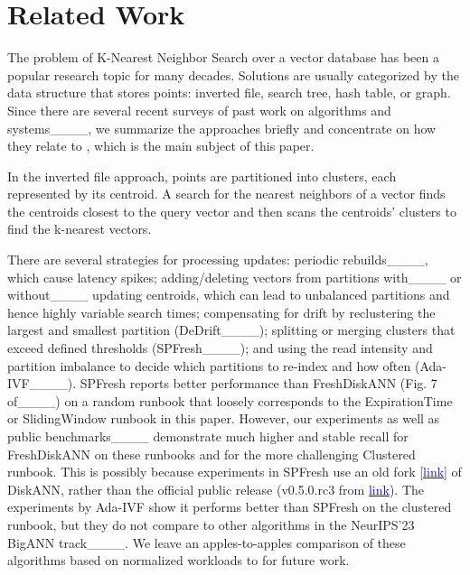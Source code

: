 \section{Related Work}
\label{sec:related}
The problem of K-Nearest Neighbor Search over a vector database
has been a popular research topic for many decades. 
Solutions are usually categorized by the data structure that stores points:
inverted file, search tree, hash table, or graph.
Since there are several recent surveys of past work on algorithms
and systems____,
we summarize the approaches briefly and concentrate on how they relate to \name,
which is the main subject of this paper.

In the inverted file approach, points are partitioned into 
clusters, each represented by its centroid.
A search for the nearest neighbors of a vector finds the centroids closest to the query vector and then scans the centroids' clusters to find the k-nearest vectors.

There are several strategies for processing updates: 
periodic rebuilds____, which cause latency spikes; 
adding/deleting vectors from partitions with____ or without____ updating centroids, which can lead to unbalanced partitions and hence highly variable search times; 
compensating for drift by reclustering the largest and smallest partition (DeDrift____);
splitting or merging clusters that exceed defined thresholds (SPFresh____);
and using the read intensity and partition imbalance to decide which partitions
to re-index and how often (Ada-IVF____).
SPFresh  reports better performance than FreshDiskANN (Fig. 7 of____)
on a random runbook
that loosely corresponds to the ExpirationTime or SlidingWindow runbook
in this paper.
However, our experiments as well as  public benchmarks____
demonstrate much higher and stable recall for FreshDiskANN on these runbooks
and for the more challenging Clustered runbook. 
This is possibly because experiments in SPFresh use an old fork [\href{https://github.com/Yuming-Xu/DiskANN_Baseline/commits/main/}{\textcolor{blue}{link}}] of DiskANN, 
rather than the official public release (v0.5.0.rc3
from \href{https://github.com/microsoft/DiskANN/tags}{\textcolor{blue}{link}}).
The experiments by Ada-IVF show it performs better than SPFresh on the clustered runbook,
but they do not compare to other algorithms in the NeurIPS'23 BigANN track____. 
We leave an apples-to-apples comparison of these algorithms
based on normalized workloads to \name for future work.



